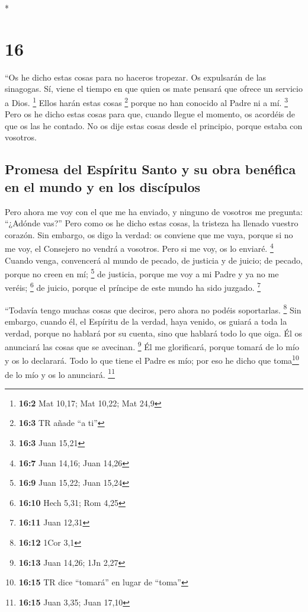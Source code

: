 \begin{paracol}{2}
\begin{otherlanguage}{english}
\end{otherlanguage}

\switchcolumn[0]*

\hypertarget{section-30}{%
\section{16}\label{section-30}}

 ``Os he dicho estas cosas para no haceros tropezar.
 Os expulsarán de las sinagogas. Sí, viene el tiempo en
que quien os mate pensará que ofrece un servicio a Dios. \footnote{\textbf{16:2}
  Mat 10,17; Mat 10,22; Mat 24,9}  Ellos harán estas cosas
\footnote{\textbf{16:3} TR añade ``a ti''} porque no han conocido al
Padre ni a mí. \footnote{\textbf{16:3} Juan 15,21}  Pero
os he dicho estas cosas para que, cuando llegue el momento, os acordéis
de que os las he contado. No os dije estas cosas desde el principio,
porque estaba con vosotros.

\hypertarget{promesa-del-espuxedritu-santo-y-su-obra-benuxe9fica-en-el-mundo-y-en-los-discuxedpulos}{%
\subsection{Promesa del Espíritu Santo y su obra benéfica en el mundo y
en los
discípulos}\label{promesa-del-espuxedritu-santo-y-su-obra-benuxe9fica-en-el-mundo-y-en-los-discuxedpulos}}

 Pero ahora me voy con el que me ha enviado, y ninguno de
vosotros me pregunta: ``¿Adónde vas?''  Pero como os he
dicho estas cosas, la tristeza ha llenado vuestro corazón.
 Sin embargo, os digo la verdad: os conviene que me vaya,
porque si no me voy, el Consejero no vendrá a vosotros. Pero si me voy,
os lo enviaré. \footnote{\textbf{16:7} Juan 14,16; Juan 14,26}
 Cuando venga, convencerá al mundo de pecado, de justicia
y de juicio;  de pecado, porque no creen en mí;
\footnote{\textbf{16:9} Juan 15,22; Juan 15,24}  de
justicia, porque me voy a mi Padre y ya no me veréis; \footnote{\textbf{16:10}
  Hech 5,31; Rom 4,25}  de juicio, porque el príncipe de
este mundo ha sido juzgado. \footnote{\textbf{16:11} Juan 12,31}

 ``Todavía tengo muchas cosas que deciros, pero ahora no
podéis soportarlas. \footnote{\textbf{16:12} 1Cor 3,1} 
Sin embargo, cuando él, el Espíritu de la verdad, haya venido, os guiará
a toda la verdad, porque no hablará por su cuenta, sino que hablará todo
lo que oiga. Él os anunciará las cosas que se avecinan. \footnote{\textbf{16:13}
  Juan 14,26; 1Jn 2,27}  Él me glorificará, porque tomará
de lo mío y os lo declarará.  Todo lo que tiene el Padre
es mío; por eso he dicho que toma\footnote{\textbf{16:15} TR dice
  ``tomará'' en lugar de ``toma''} de lo mío y os lo anunciará.
\footnote{\textbf{16:15} Juan 3,35; Juan 17,10}


\end{paracol}
